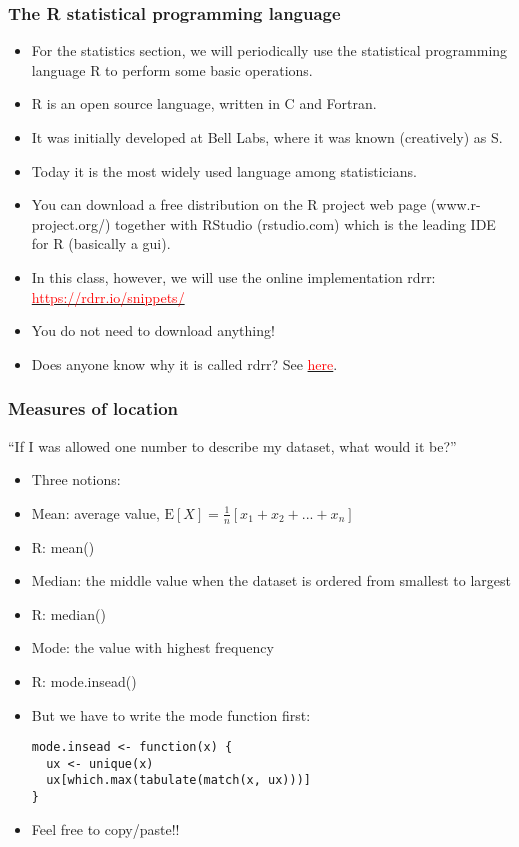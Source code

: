 \documentclass[xcolor=dvipsnames]{beamer} %
\begin{document}
\begin{frame}
\frametitle{The R statistical programming language}
\begin{scriptsize}
\begin{itemize}
    \itemsep\setlength{1em}
\item For the statistics section, we will periodically use the statistical programming language \textcolor{dark_red}{\textsf{R}} to perform some basic operations. 
\item \textcolor{dark_red}{\textsf{R}} is an open source language, written in C and Fortran. 
\item It was initially developed at Bell Labs, where it was known (creatively) as S. 
\item Today it is the most widely used language among statisticians. 
\item You can download a free distribution on the \textcolor{dark_red}{\textsf{R}} project web page (www.r-project.org/) together with RStudio (rstudio.com) which is the leading IDE for \textcolor{dark_red}{\textsf{R}} (basically a gui). 
\item In this class, however, we will use the online implementation rdrr: \href{https://rdrr.io/snippets/}{ \textcolor{red}{https://rdrr.io/snippets/} }
\item You do not need to download anything!
\item Does anyone know why it is called rdrr? See \href{https://www.youtube.com/watch?v=gSFd_2oJgak}{\textcolor{red}{here}}.
\end{itemize}
\end{scriptsize}
\end{frame}

\begin{frame}[fragile]
\frametitle{Measures of location}
\begin{scriptsize}
``If I was allowed one number to describe my dataset, what would it be?''
\begin{itemize}
\item Three notions: 
\item Mean: average value, $\mathrm{E}[X] = \frac{1}{n} [x_1 + x_2 + ... + x_n]$
\item[] \textcolor{dark_red}{\textsf{R}: mean()}
\item Median: the middle value when the dataset is ordered from smallest to largest
\item[] \textcolor{dark_red}{\textsf{R}: median()}
\item Mode: the value with highest frequency
\item[] \textcolor{dark_red}{\textsf{R}: mode.insead()}
\item[] But we have to write the mode function first: 
\begin{verbatim}
mode.insead <- function(x) {
  ux <- unique(x)
  ux[which.max(tabulate(match(x, ux)))]
}
\end{verbatim}
\item Feel free to copy/paste!! 
\end{itemize}
\end{scriptsize}
\end{frame}
\end{document}
